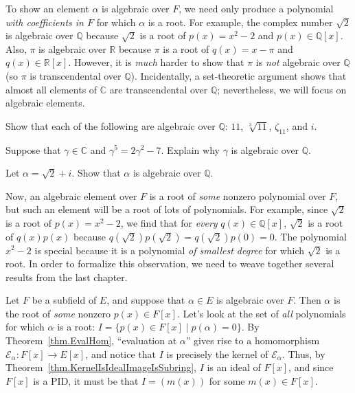 To show an element $\alpha$ is algebraic over $F$, we need only produce a polynomial \emph{with coefficients in $F$} for which $\alpha$ is a root. For example, the complex number $\sqrt{2}$ is algebraic over $\mathbb{Q}$ because $\sqrt{2}$ is a root of $p(x) = x^2 - 2$ and $p(x) \in \mathbb{Q}[x]$. Also, $\pi$ is algebraic over $\mathbb{R}$ because $\pi$ is a root of $q(x) = x-\pi$ and $q(x) \in \mathbb{R}[x]$. However, it is \emph{much} harder to show that $\pi$ is \emph{not} algebraic over $\mathbb{Q}$ (so  $\pi$ is transcendental over $\mathbb{Q}$). Incidentally, a set-theoretic argument  shows that almost all elements of $\mathbb{C}$ are transcendental over $\mathbb{Q}$; nevertheless, we will focus on algebraic elements.

\begin{problem}
Show that each of the following are algebraic over $\mathbb{Q}$: $11$, $\sqrt[3]{11}$, $\zeta_{11}$, and $i$.
\end{problem}

\begin{problem}
Suppose that $\gamma \in \mathbb{C}$ and $\gamma^5 = 2\gamma^2 -7$. Explain why $\gamma$ is algebraic over $\mathbb{Q}$.
\end{problem}

\begin{problem}\label{prob.Sqrt2PlusIIsAlgebraic}
Let $\alpha = \sqrt{2} + i$. Show that $\alpha$ is algebraic over $\mathbb{Q}$.
\end{problem}

Now, an algebraic element over $F$ is a root of \emph{some} nonzero polynomial over $F$, but such an element will be a root of lots of polynomials. For example, since $\sqrt{2}$ is a root of $p(x) = x^2 - 2$, we find that for \emph{every} $q(x)\in \mathbb{Q}[x]$, $\sqrt{2}$ is a root of $q(x)p(x)$ because $q(\sqrt{2})p(\sqrt{2}) =  q(\sqrt{2})p(0) =0$. The polynomial $x^2 - 2$ is special because it is a polynomial \emph{of smallest degree} for which $\sqrt{2}$ is a root. In order to formalize this observation, we need to weave together several results from the last chapter. 

Let $F$ be a subfield of $E$, and suppose that $\alpha\in E$ is algebraic over $F$. Then $\alpha$ is the root of \emph{some} nonzero $p(x)\in F[x]$.  Let's look at the set of \emph{all} polynomials for which $\alpha$ is a root: $I = \{p(x)\in F[x]\mid p(\alpha) = 0\}$. By Theorem~\ref{thm.EvalHom}, ``evaluation at $\alpha$'' gives rise to a homomorphism $\mathcal{E}_\alpha: F[x] \to E[x]$, and notice that $I$ is precisely the kernel of $\mathcal{E}_\alpha$. Thus, by Theorem~\ref{thm.KernelIsIdealImageIsSubring}, $I$ is an ideal of $F[x]$, and since $F[x]$ is a PID, it must be that $I = (m(x))$ for some $m(x) \in F[x]$. 

